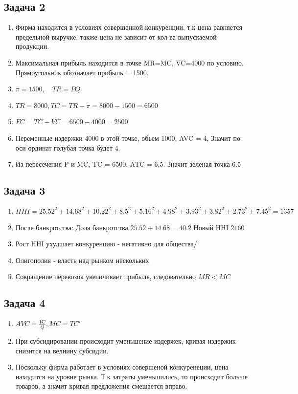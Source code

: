 \documentclass[a4paper,12pt]{article}
\begin{document}
\subsection{Задача 2}
\begin{enumerate}
    \item Фирма находится в условиях совершенной конкуренции, т.к цена равняется предельной выручке, также цена не зависит от кол-ва выпускаемой продукции.
    \item Максимальная прибыль находится в точке MR=MC, VC=4000 по условию. Прямоугольник обозначает прибыль = 1500.
    \item $\pi = 1500, \quad TR=PQ$
    \item $TR = 8000, TC = TR - \pi = 8000 - 1500 = 6500$
    \item $FC = TC - VC = 6500 - 4000 = 2500$
    \item Переменные издержки 4000 в этой точке, обьем 1000, AVC = 4, Значит по оси ординат голубая точка будет 4.
    \item Из  пересечения P и MC, TC = 6500. ATC = 6,5. Значит зеленая точка 6.5
\end{enumerate}

\subsection{Задача 3}
\begin{enumerate}
    \item $HHI = 25.52^2 + 14.68^2 + 10.22^2 + 8.5^2 + 5.16^2 + 4.98^2 + 3.93^2 + 3.82^2 + 2.73^2 + 7.45^2 =1357$
    \item После банкротства: Доля банкротства $25.52 + 14.68 = 40.2$ Новый HHI $2160$
    \item Рост HHI ухудшает конкуренцию - негативно для общества/
    \item Олигополия - власть над рынком нескольких
    \item Сокращение перевозок увеличивает прибыль, следовательно $MR < MC$
\end{enumerate}

\subsection{Задача 4}
\begin{enumerate}
    \item $AVC = \frac{VC}{Q}, MC = TC'$
    \item При субсидировании происходит уменьшение издержек, кривая издержик снизится на велиину субсидии.
    \item Поскольку фирма работает в условиях совершеной конкуренеции, цена находится на уровне рынка. Т.к затраты уменьшились, то происходит больше товаров, а значит кривая предложения смещается вправо.
\end{enumerate}
\end{document}
